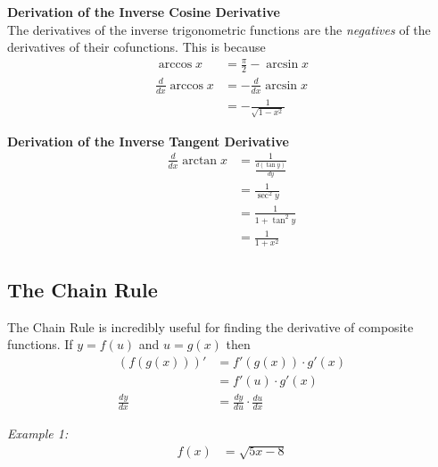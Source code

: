 \documentclass{article}
\begin{document}
            \noindent \color{purple} \textbf{Derivation of the Inverse Cosine Derivative} \color{black} \\
            The derivatives of the inverse trigonometric functions are the \textit{negatives} of the
            derivatives of their cofunctions. This is because \\

            \begin{align*}
                \arccos{x} &= \frac{\pi}{2} - \arcsin{x} \\
                \frac{d}{dx}\arccos{x} &= -\frac{d}{dx}\arcsin{x} \\
                &= -\frac{1}{\sqrt{1-x^2}}
            \end{align*}

            \noindent \color{purple} \textbf{Derivation of the Inverse Tangent Derivative} \color{black} \\

            \begin{align*}
                \frac{d}{dx}\arctan{x} &= \frac{1}{\frac{d(\tan{y})}{dy}} \\
                &= \frac{1}{\sec^2{y}} \\
                &= \frac{1}{1+\tan^2{y}} \\
                &= \frac{1}{1+x^2}
            \end{align*}

        \pagebreak
        \subsection{The Chain Rule}
            The Chain Rule is incredibly useful for finding the derivative of composite functions.
            If $y=f(u)$ and $u=g(x)$ then \\

            \begin{align*}
                (f(g(x)))' &= f'(g(x)) \cdot g'(x) \\
                &= f'(u) \cdot g'(x) \\
                \frac{dy}{dx} &= \frac{dy}{du} \cdot \frac{du}{dx}
            \end{align*}

            \noindent \color{blue} \textit{Example 1:} \color{black} \\

            \begin{align*}
                f(x) &= \sqrt{5x-8} \\
            \end{align*}
\end{document}
